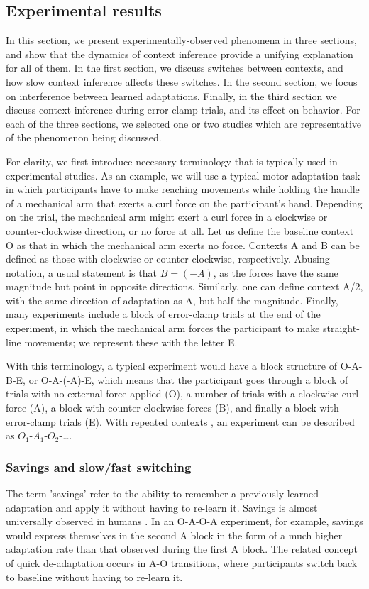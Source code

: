 \documentclass[a4paper,doc,floatsintext,natbib]{apa6}
\begin{document}
\subsection{Experimental results}
In this section, we present experimentally-observed phenomena in three sections, and show that the dynamics of context inference provide a unifying explanation for all of them. In the first section, we discuss switches between contexts, and how slow context inference affects these switches. In the second section, we focus on interference between learned adaptations. Finally, in the third section we discuss context inference during error-clamp trials, and its effect on behavior. For each of the three sections, we selected one or two studies which are representative of the phenomenon being discussed.

For clarity, we first introduce necessary terminology that is typically used in experimental studies. As an example, we will use a typical motor adaptation task in which participants have to make reaching movements while holding the handle of a mechanical arm that exerts a curl force on the participant's hand. Depending on the trial, the mechanical arm might exert a curl force in a clockwise or counter-clockwise direction, or no force at all. Let us define the baseline context O as that in which the mechanical arm exerts no force. Contexts A and B can be defined as those with clockwise or counter-clockwise, respectively. Abusing notation, a usual statement is that $B = (-A)$, as the forces have the same magnitude but point in opposite directions. Similarly, one can define context A/2, with the same direction of adaptation as A, but half the magnitude. Finally, many experiments include a block of error-clamp trials at the end of the experiment, in which the mechanical arm forces the participant to make straight-line movements; we represent these with the letter E.

With this terminology, a typical experiment \cite[e.g.][]{Ethier_Spontaneous_2008} would have a block structure of O-A-B-E, or O-A-(-A)-E, which means that the participant goes through a block of trials with no external force applied (O), a number of trials with a clockwise curl force (A), a block with counter-clockwise forces (B), and finally a block with error-clamp trials (E). With repeated contexts \citep[e.g.][]{Oh_Minimizing_2019}, an experiment can be described as $O_1$-$A_1$-$O_2$-\ldots .

\subsubsection{Savings and slow/fast switching}
The term 'savings' refer to the ability to remember a previously-learned adaptation and apply it without having to re-learn it. Savings is almost universally observed in humans \citep{Brashers-Krug_Consolidation_1996,Shadmehr_Functional_1997,Medina_Mechanism_2001,Smith_Interacting_2006,Zarahn_Explaining_2008}. In an O-A-O-A experiment, for example, savings would express themselves in the second A block in the form of a much higher adaptation rate than that observed during the first A block. The related concept of quick de-adaptation occurs in A-O transitions, where participants switch back to baseline without having to re-learn it.
\end{document}
